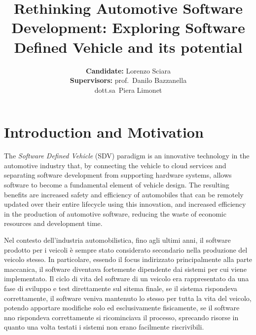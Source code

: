 \documentclass[10pt,a4paper,roman, twocolumn]{article}
\title{\LARGE\textbf{Rethinking Automotive Software Development: Exploring Software Defined Vehicle and its potential}}
\author{
	\textbf{Candidate:} Lorenzo Sciara\\
	\textbf{Supervisors:} prof.~Danilo Bazzanella \\ dott.sa~Piera Limonet
}
\date{}
\begin{document}
\setlength{\belowdisplayskip}{0pt} \setlength{\belowdisplayshortskip}{0pt}
\setlength{\abovedisplayskip}{-0.5\baselineskip} \setlength{\abovedisplayshortskip}{-0.5\baselineskip}

	
\maketitle
		
\section{Introduction and Motivation}
The \textit{Software Defined Vehicle} (SDV) paradigm is an innovative technology in the automotive industry that, by connecting the vehicle to cloud services and separating software development from supporting hardware systems, allows software to become a fundamental element of vehicle design. The resulting benefits are increased safety and efficiency of automobiles that can be remotely updated over their entire lifecycle using this innovation, and increased efficiency in the production of automotive software, reducing the waste of economic resources and development time.

Nel contesto dell'industria automobilistica, fino agli ultimi anni, il software prodotto per i veicoli è sempre stato considerato secondario nella produzione del veicolo stesso. In particolare, essendo il focus indirizzato principalmente alla parte maccanica, il software diventava fortemente dipendente dai sistemi per cui viene implementato. Il ciclo di vita del software di un veicolo era rappresentato da una fase di sviluppo e test direttamente sul sitema finale, se il sistema rispondeva correttamente, il software veniva mantenuto lo stesso per tutta la vita del veicolo, potendo apportare modifiche solo ed esclusivamente fisicamente, se il software nno rispondeva correttamente si ricominciava il processo, sprecando risorse in quanto una volta testati i sistemi non erano facilmente riscrivibili.
\end{document}
